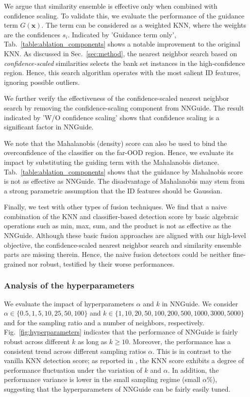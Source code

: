 \documentclass[10pt,twocolumn,letterpaper]{article}
\begin{document}
We argue that similarity ensemble is effective only when combined with confidence scaling. To validate this, we evaluate the performance of the guidance term $G(\mathbf{x})$. The term can be considered as a weighted KNN, where the weights are the confidences $s_i$. Indicated by 'Guidance term only', Tab.~\ref{table:ablation_components} shows a notable improvement to the original KNN. As discussed in Sec.~\ref{sec:method}, the nearest neighbor search based on \textit{confidence-scaled} similarities selects the bank set instances in the high-confidence region. Hence, this search algorithm operates with the most salient ID features, ignoring possible outliers. 

We further verify the effectiveness of the confidence-scaled nearest neighbor search by removing the confidence-scaling component from NNGuide. The result indicated by 'W/O confidence scaling' shows that confidence scaling is a significant factor in NNGuide.

We note that the Mahalanobis (density) score can also be used to bind the overconfidence of the classifier on the far-OOD region. Hence, we evaluate its impact by substituting the guiding term with the Mahalanobis distance.
Tab.~\ref{table:ablation_components} shows that the guidance by Mahalnobis score is not as effective as NNGuide. The disadvantage of Mahalanobis may stem from a strong parametric assumption that the ID features should be Gaussian. 


Finally, we test with other types of fusion techniques. We find that a naive combination of the KNN and classifier-based detection score by basic algebraic operations such as min, max, sum, and the product is not as effective as the NNGuide. Although these basic fusion approaches are aligned with our high-level objective, the confidence-scaled nearest neighbor search and similarity ensemble parts are missing therein. Hence, the naive fusion detectors could be neither fine-grained nor robust, testified by their worse performances.

\subsubsection{Analysis of the hyperparameters}
\label{sec:exp_ablation_hyperparameters}
We evaluate the impact of hyperparameters $\alpha$ and $k$ in NNGuide. We consider $\alpha \in \{0.5, 1, 5, 10, 25, 50, 100\}$ and $k \in \{1, 10, 20, 50, 100, 200, 500, 1000, 3000, 5000\}$ and  for the sampling ratio and  a number of neighbors, respectively. 
Fig.~\ref{fig:hyperparameters} indicates that the performance of NNGuide is fairly robust across different $k$ as long as $k \geq 10$. Moreover, the performance has a consistent trend across different sampling ratios $\alpha$.  This is in contrast to the vanilla KNN detection score; as reported in \cite{sun2022out}, the KNN score exhibits a degree of performance fluctuation under the variation of $k$ and $\alpha$. In addition, the performance variance is lower in the small sampling regime (\ie small $\alpha$\%), suggesting that the hyperparameters of NNGuide can be fairly easily tuned.  
\end{document}
